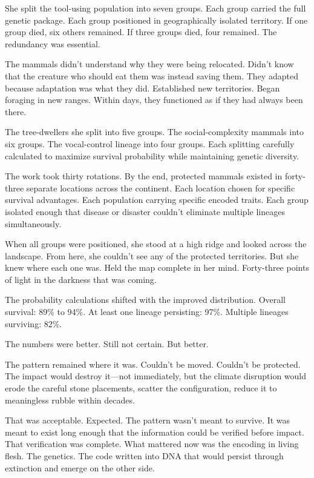She split the tool-using population into seven groups. Each group carried the full genetic package. Each group positioned in geographically isolated territory. If one group died, six others remained. If three groups died, four remained. The redundancy was essential.

The mammals didn't understand why they were being relocated. Didn't know that the creature who should eat them was instead saving them. They adapted because adaptation was what they did. Established new territories. Began foraging in new ranges. Within days, they functioned as if they had always been there.

The tree-dwellers she split into five groups. The social-complexity mammals into six groups. The vocal-control lineage into four groups. Each splitting carefully calculated to maximize survival probability while maintaining genetic diversity.

The work took thirty rotations. By the end, protected mammals existed in forty-three separate locations across the continent. Each location chosen for specific survival advantages. Each population carrying specific encoded traits. Each group isolated enough that disease or disaster couldn't eliminate multiple lineages simultaneously.

When all groups were positioned, she stood at a high ridge and looked across the landscape. From here, she couldn't see any of the protected territories. But she knew where each one was. Held the map complete in her mind. Forty-three points of light in the darkness that was coming.

The probability calculations shifted with the improved distribution. Overall survival: 89\% to 94\%. At least one lineage persisting: 97\%. Multiple lineages surviving: 82\%.

The numbers were better. Still not certain. But better.

\scenebreak

The pattern remained where it was. Couldn't be moved. Couldn't be protected. The impact would destroy it—not immediately, but the climate disruption would erode the careful stone placements, scatter the configuration, reduce it to meaningless rubble within decades.

That was acceptable. Expected. The pattern wasn't meant to survive. It was meant to exist long enough that the information could be verified before impact. That verification was complete. What mattered now was the encoding in living flesh. The genetics. The code written into DNA that would persist through extinction and emerge on the other side.

